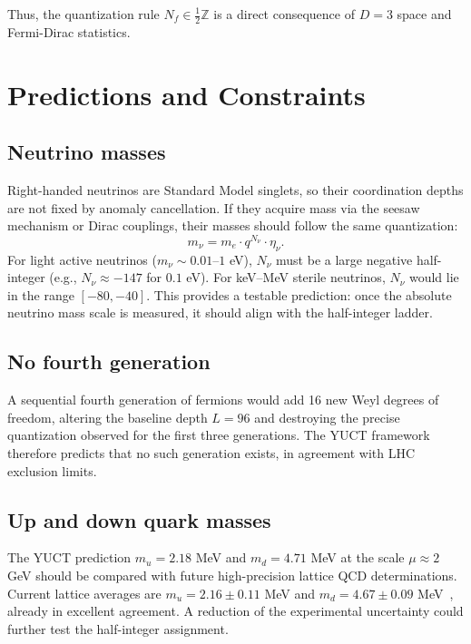 \documentclass[12pt,a4paper]{article}
\begin{document}
	Thus, the quantization rule \(N_f \in \frac{1}{2}\mathbb{Z}\) is a direct consequence of \(D=3\) space and Fermi-Dirac statistics.
	
	\section{Predictions and Constraints}
	
	\subsection{Neutrino masses}
	
	Right-handed neutrinos are Standard Model singlets, so their coordination depths are not fixed by anomaly cancellation. If they acquire mass via the seesaw mechanism or Dirac couplings, their masses should follow the same quantization:
	\begin{equation}
		m_\nu = m_e \cdot q^{N_\nu} \cdot \eta_\nu.
	\end{equation}
	For light active neutrinos (\(m_\nu \sim 0.01\)–\(1\) eV), \(N_\nu\) must be a large negative half-integer (e.g., \(N_\nu \approx -147\) for \(0.1\) eV). For keV–MeV sterile neutrinos, \(N_\nu\) would lie in the range \([-80, -40]\). This provides a testable prediction: once the absolute neutrino mass scale is measured, it should align with the half-integer ladder.
	
	\subsection{No fourth generation}
	
	A sequential fourth generation of fermions would add 16 new Weyl degrees of freedom, altering the baseline depth \(L=96\) and destroying the precise quantization observed for the first three generations. The YUCT framework therefore predicts that no such generation exists, in agreement with LHC exclusion limits.
	
	\subsection{Up and down quark masses}
	
	The YUCT prediction \(m_u = 2.18\) MeV and \(m_d = 4.71\) MeV at the scale \(\mu \approx 2\) GeV should be compared with future high-precision lattice QCD determinations. Current lattice averages are \(m_u = 2.16 \pm 0.11\) MeV and \(m_d = 4.67 \pm 0.09\) MeV~\cite{PDG2024}, already in excellent agreement. A reduction of the experimental uncertainty could further test the half-integer assignment.
	
\end{document}

